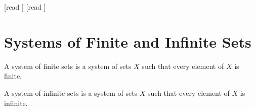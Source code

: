 \documentclass[10pt]{article}
\begin{document}
  \begin{imports}
    \begin{forthel}
      [read ]
      [read ]
    \end{forthel}
  \end{imports}


  \section*{Systems of Finite and Infinite Sets}

  \begin{forthel}
    \begin{definition}[id=FOUNDATIONS_14_1387314525765632,printid]
      A system of finite sets is a system of sets $X$ such that every element of $X$ is finite.
    \end{definition}
  \end{forthel}

  \begin{forthel}
    \begin{definition}[id=FOUNDATIONS_14_5698452102154785,printid]
      A system of infinite sets is a system of sets $X$ such that every element of $X$ is infinite.
    \end{definition}
  \end{forthel}
\end{document}
